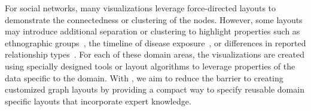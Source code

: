 For social networks, many visualizations leverage force-directed layouts
to demonstrate the connectedness or clustering of the nodes. However, some
layouts may introduce additional separation or clustering
to highlight properties such as ethnographic groups~\cite{rothenberg1998using},
the timeline of disease
exposure~\cite{fitzpatrick2001preventable,mcelroy2003network},
or differences in reported relationship types~\cite{fu2011hiv}.
For each of these domain areas, the visualizations are created using specially
designed tools or layout algorithms to leverage properties of the data
specific to the domain. With \projectname, we aim to reduce the barrier to
creating customized graph layouts by providing a compact way to specify
reusable domain specific layouts that incorporate expert knowledge.





